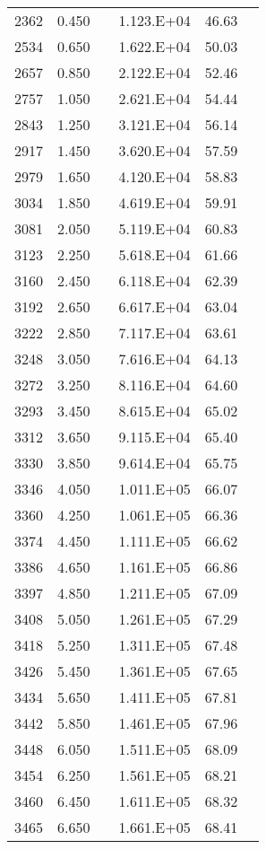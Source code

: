 \begin{longtable}{cccccc}
2362 & 0.450 &  & 1.123.E+04 & 46.63 &  \\
2534 & 0.650 &  & 1.622.E+04 & 50.03 &  \\
2657 & 0.850 &  & 2.122.E+04 & 52.46 &  \\
2757 & 1.050 &  & 2.621.E+04 & 54.44 &  \\
2843 & 1.250 &  & 3.121.E+04 & 56.14 &  \\
2917 & 1.450 &  & 3.620.E+04 & 57.59 &  \\
2979 & 1.650 &  & 4.120.E+04 & 58.83 &  \\
3034 & 1.850 &  & 4.619.E+04 & 59.91 &  \\
3081 & 2.050 &  & 5.119.E+04 & 60.83 &  \\
3123 & 2.250 &  & 5.618.E+04 & 61.66 &  \\
3160 & 2.450 &  & 6.118.E+04 & 62.39 &  \\
3192 & 2.650 &  & 6.617.E+04 & 63.04 &  \\
3222 & 2.850 &  & 7.117.E+04 & 63.61 &  \\
3248 & 3.050 &  & 7.616.E+04 & 64.13 &  \\
3272 & 3.250 &  & 8.116.E+04 & 64.60 &  \\
3293 & 3.450 &  & 8.615.E+04 & 65.02 &  \\
3312 & 3.650 &  & 9.115.E+04 & 65.40 &  \\
3330 & 3.850 &  & 9.614.E+04 & 65.75 &  \\
3346 & 4.050 &  & 1.011.E+05 & 66.07 &  \\
3360 & 4.250 &  & 1.061.E+05 & 66.36 &  \\
3374 & 4.450 &  & 1.111.E+05 & 66.62 &  \\
3386 & 4.650 &  & 1.161.E+05 & 66.86 &  \\
3397 & 4.850 &  & 1.211.E+05 & 67.09 &  \\
3408 & 5.050 &  & 1.261.E+05 & 67.29 &  \\
3418 & 5.250 &  & 1.311.E+05 & 67.48 &  \\
3426 & 5.450 &  & 1.361.E+05 & 67.65 &  \\
3434 & 5.650 &  & 1.411.E+05 & 67.81 &  \\
3442 & 5.850 &  & 1.461.E+05 & 67.96 &  \\
3448 & 6.050 &  & 1.511.E+05 & 68.09 &  \\
3454 & 6.250 &  & 1.561.E+05 & 68.21 &  \\
3460 & 6.450 &  & 1.611.E+05 & 68.32 &  \\
3465 & 6.650 &  & 1.661.E+05 & 68.41 &  \\

\end{longtable}
